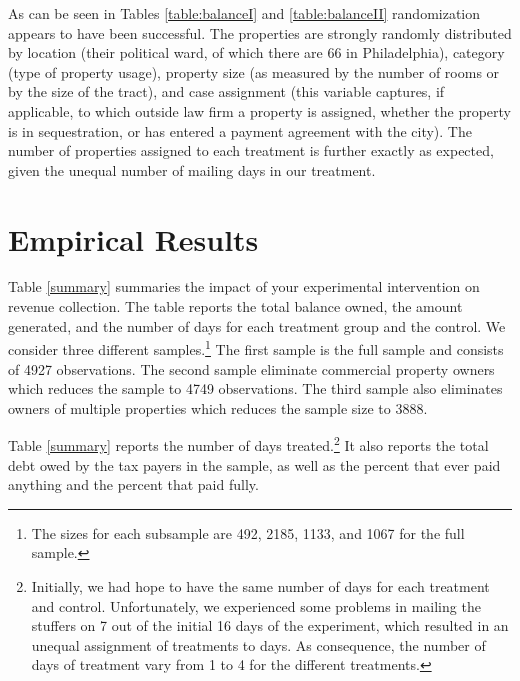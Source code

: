 \documentclass[12pt,titlepage]{article}
\begin{document}
As can be seen in Tables \ref{table:balanceI} and
\ref{table:balanceII} randomization appears to have been successful.
The properties are strongly randomly distributed by location (their
political ward, of which there are 66 in Philadelphia), category (type
of property usage), property size (as measured by the number of rooms
or by the size of the tract), and case assignment (this variable
captures, if applicable, to which outside law firm a property is
assigned, whether the property is in sequestration, or has entered a
payment agreement with the city). The number of properties assigned to
each treatment is further exactly as expected, given the unequal
number of mailing days in our treatment.


\section{Empirical Results}


Table \ref{summary} summaries the impact of your experimental
intervention on revenue collection.  The table reports the total
balance owned, the amount generated, and the number of days for each
treatment group and the control. We consider three different
samples.\footnote{The sizes for each subsample are 492, 2185, 1133,
  and 1067 for the full sample.} The first sample is the full sample
and consists of 4927 observations. The second sample eliminate
commercial property owners which reduces the sample to 4749
observations. The third sample also eliminates owners of multiple
properties which reduces the sample size to 3888.

Table \ref{summary} reports the number of days
treated.\footnote{Initially, we had hope to have the same number of
  days for each treatment and control. Unfortunately, we experienced
  some problems in mailing the stuffers on 7 out of the initial 16
  days of the experiment, which resulted in an unequal assignment of
  treatments to days. As consequence, the number of days of treatment
  vary from 1 to 4 for the different treatments.} It also reports the
total debt owed by the tax payers in the sample, as well as the
percent that ever paid anything and the percent that paid fully.
\end{document}
